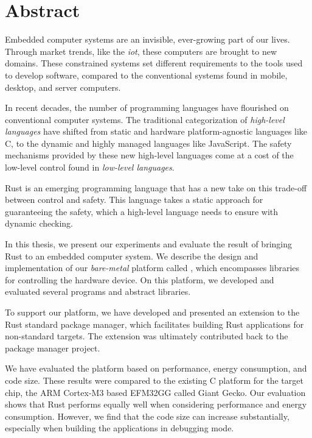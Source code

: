 
\chapter{Abstract}
\label{chap:abstract}

Embedded computer systems are an invisible, ever-growing part of our lives.
Through market trends, like the \emph{\glsdesc{iot}}, these computers are brought to new domains.
These constrained systems set different requirements to the tools used to develop software, compared to the conventional systems found in mobile, desktop, and server computers.

In recent decades, the number of programming languages have flourished on conventional computer systems.
The traditional categorization of \emph{high-level languages} have shifted from static and hardware platform-agnostic languages like C, to the dynamic and highly managed languages like JavaScript.
The safety mechanisms provided by these new high-level languages come at a cost of the low-level control found in \emph{low-level languages}.

Rust is an emerging programming language that has a new take on this trade-off between control and safety.
This language takes a static approach for guaranteeing the safety, which a high-level language needs to ensure with dynamic checking.

In this thesis, we present our experiments and evaluate the result of bringing Rust to an embedded computer system.
We describe the design and implementation of our \emph{bare-metal} platform called {\rg}, which encompasses libraries for controlling the hardware device.
On this platform, we developed and evaluated several programs and abstract libraries.

To support our platform, we have developed and presented an extension to the Rust standard package manager, which facilitates building Rust applications for non-standard targets.
The extension was ultimately contributed back to the package manager project.

We have evaluated the platform based on performance, energy consumption, and code size.
These results were compared to the existing C platform for the target chip, the ARM Cortex-M3 based EFM32GG called Giant Gecko.
Our evaluation shows that Rust performs equally well when considering performance and energy consumption.
However, we find that the code size can increase substantially, especially when building the applications in debugging mode.
